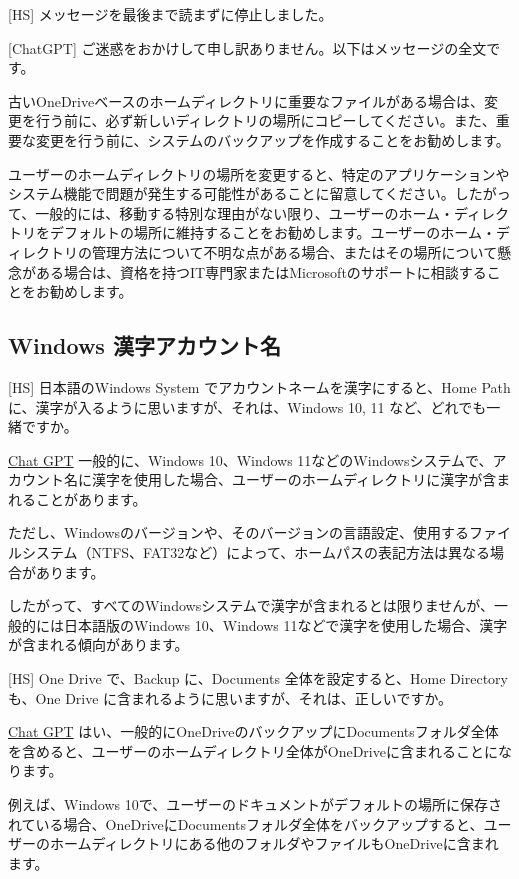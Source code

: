 \documentclass[
]{bxjsbook}
\theoremstyle{definition}
\theoremstyle{definition}
\theoremstyle{definition}
\theoremstyle{definition}
\theoremstyle{remark}
\begin{document}
{[}HS{]} メッセージを最後まで読まずに停止しました。

{[}ChatGPT{]} ご迷惑をおかけして申し訳ありません。以下はメッセージの全文です。

古いOneDriveベースのホームディレクトリに重要なファイルがある場合は、変更を行う前に、必ず新しいディレクトリの場所にコピーしてください。また、重要な変更を行う前に、システムのバックアップを作成することをお勧めします。

ユーザーのホームディレクトリの場所を変更すると、特定のアプリケーションやシステム機能で問題が発生する可能性があることに留意してください。したがって、一般的には、移動する特別な理由がない限り、ユーザーのホーム・ディレクトリをデフォルトの場所に維持することをお勧めします。ユーザーのホーム・ディレクトリの管理方法について不明な点がある場合、またはその場所について懸念がある場合は、資格を持つIT専門家またはMicrosoftのサポートに相談することをお勧めします。

\hypertarget{windowsaccount}{%
\subsection{Windows 漢字アカウント名}\label{windowsaccount}}

{[}HS{]} 日本語のWindows System でアカウントネームを漢字にすると、Home Path に、漢字が入るように思いますが、それは、Windows 10, 11 など、どれでも一緒ですか。

\protect\hyperlink{chatgpt}{Chat GPT} 一般的に、Windows 10、Windows 11などのWindowsシステムで、アカウント名に漢字を使用した場合、ユーザーのホームディレクトリに漢字が含まれることがあります。

ただし、Windowsのバージョンや、そのバージョンの言語設定、使用するファイルシステム（NTFS、FAT32など）によって、ホームパスの表記方法は異なる場合があります。

したがって、すべてのWindowsシステムで漢字が含まれるとは限りませんが、一般的には日本語版のWindows 10、Windows 11などで漢字を使用した場合、漢字が含まれる傾向があります。

{[}HS{]} One Drive で、Backup に、Documents 全体を設定すると、Home Directory も、One Drive に含まれるように思いますが、それは、正しいですか。

\protect\hyperlink{chatgpt}{Chat GPT} はい、一般的にOneDriveのバックアップにDocumentsフォルダ全体を含めると、ユーザーのホームディレクトリ全体がOneDriveに含まれることになります。

例えば、Windows 10で、ユーザーのドキュメントがデフォルトの場所に保存されている場合、OneDriveにDocumentsフォルダ全体をバックアップすると、ユーザーのホームディレクトリにある他のフォルダやファイルもOneDriveに含まれます。
\end{document}
